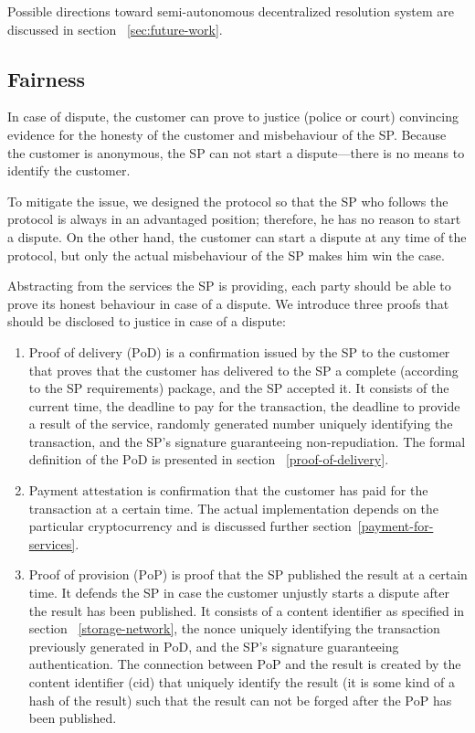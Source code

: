 \documentclass{ieeeaccess}
\begin{document}
Possible directions toward semi-autonomous decentralized resolution system are discussed in section ~\ref{sec:future-work}.

\subsection{Fairness}\label{fairness}

In case of dispute, the customer can prove to justice (police or court) convincing evidence for the honesty of the customer and misbehaviour of the SP. 
Because the customer is anonymous, the SP can not start a dispute---there is no means to identify the customer.

To mitigate the issue, we designed the protocol so that the SP who follows the protocol is always in an advantaged position; therefore, he has no reason to start a dispute. On the other hand, the customer can start a dispute at any time of the protocol, but only the actual misbehaviour of the SP makes him win the case.


Abstracting from the services the SP is providing, each party should be able to prove its honest behaviour in case of a dispute. We introduce three proofs that should be disclosed to justice in case of a dispute:

\begin{enumerate}
    \item Proof of delivery ($\mathrm{PoD}$) is a confirmation issued by the SP to the customer that proves that the customer has delivered to the SP a complete (according to the SP requirements) package, and the SP accepted it. It consists of the current time, the deadline to pay for the transaction, the deadline to provide a result of the service, randomly generated number uniquely identifying the transaction, and the SP's signature guaranteeing non-repudiation. The formal definition of the $\mathrm{PoD}$ is presented in section ~\ref{proof-of-delivery}.
    
    \item Payment $\mathrm{attestation}$ is confirmation that the customer has paid for the transaction at a certain time. The actual implementation depends on the particular cryptocurrency and is discussed further section~\ref{payment-for-services}.
    
    \item Proof of provision ($\mathrm{PoP}$) is proof that the SP published the result at a certain time. It defends the SP in case the customer unjustly starts a dispute after the result has been published. It consists of a content identifier as specified in section ~\ref{storage-network}, the $\mathrm{nonce}$ uniquely identifying the transaction previously generated in $\mathrm{PoD}$, and the SP's signature guaranteeing authentication. The connection between $\mathrm{PoP}$ and the result is created by the content identifier ($\mathrm{cid}$) that uniquely identify the result (it is some kind of a hash of the result) such that the result can not be forged after the $\mathrm{PoP}$ has been published.
\end{enumerate}
\end{document}
